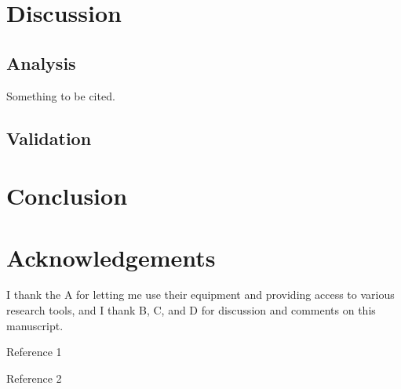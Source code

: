 \documentclass{Resources/UoBLab1}
\begin{document}
\section{Discussion}
\subsection{Analysis}
\lipsum[8]
Something to be cited.\cite{reference2}
\lipsum[2]

\subsection{Validation}
\lipsum[9]

\section{Conclusion}
\lipsum[10]

\section*{Acknowledgements}
I thank the A for letting me use their equipment and providing access to various research tools, and I thank B, C, and D for discussion and comments on this manuscript.

\begin{thebibliography}{}

Reference 1

Reference 2

\end{thebibliography}
\end{document}
